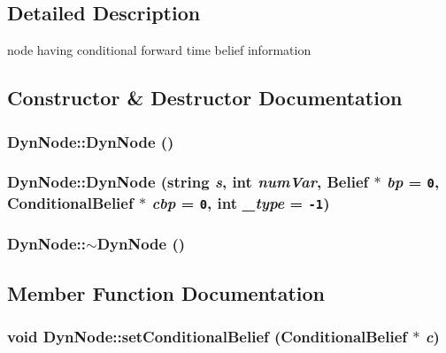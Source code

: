 \subsection{Detailed Description}
node having conditional forward time belief information 



\subsection{Constructor \& Destructor Documentation}
\subsubsection{\setlength{\rightskip}{0pt plus 5cm}DynNode::DynNode ()\hspace{0.3cm}{\tt  [inline]}}\label{classDynNode_f6e18d6646c290d1cc617e7f97837607}


\subsubsection{\setlength{\rightskip}{0pt plus 5cm}DynNode::DynNode (string {\em s}, int {\em numVar}, {\bf Belief} $\ast$ {\em bp} = {\tt 0}, {\bf ConditionalBelief} $\ast$ {\em cbp} = {\tt 0}, int {\em \_\-type} = {\tt -1})}\label{classDynNode_06541a46e4f4fc4db612917774e02a85}


\subsubsection{\setlength{\rightskip}{0pt plus 5cm}DynNode::$\sim$DynNode ()\hspace{0.3cm}{\tt  [inline]}}\label{classDynNode_be9a7aa589d8a07b52449724a9ca6240}




\subsection{Member Function Documentation}
\subsubsection{\setlength{\rightskip}{0pt plus 5cm}void DynNode::setConditionalBelief ({\bf ConditionalBelief} $\ast$ {\em c})\hspace{0.3cm}{\tt  [inline]}}\label{classDynNode_902d5999f06d232efba16c77b7366809}


